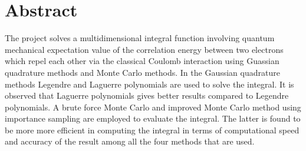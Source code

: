 \chapter*{Abstract}
The project solves a multidimensional integral function involving quantum mechanical expectation value of the correlation energy between two electrons which repel each other via the classical Coulomb interaction using Guassian quadrature methods and Monte Carlo methods. 
In the Gaussian quadrature methods Legendre and Laguerre polynomials are used to solve the integral. 
It is observed that Laguerre polynomials gives better results compared to Legendre polynomials.
A brute force Monte Carlo and improved Monte Carlo method using importance sampling are employed to evaluate the integral.
The latter is found to be more more efficient in computing the integral in terms of computational speed and accuracy of the result among all the four methods that are used.